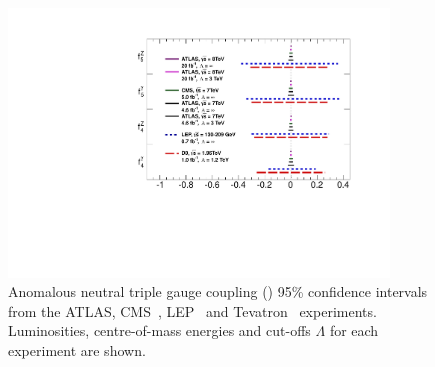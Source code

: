  \begin{figure}[htbp]
 \begin{center}
  \includegraphics[width=0.9\textwidth]{SummaryPlot}\hfill
  \caption{\small 
Anomalous neutral triple gauge coupling (\TGC) 95\% confidence intervals from the ATLAS, CMS~\cite{CMS:2012rg},
LEP~\cite{bib:LEPEW2006} and Tevatron~\cite{Abazov:2007ad}
experiments. Luminosities, centre-of-mass energies and cut-offs $\Lambda$ for each experiment are shown.
   }
\label{fig:TGC-SummaryPlot}
 \end{center}
 \end{figure}
